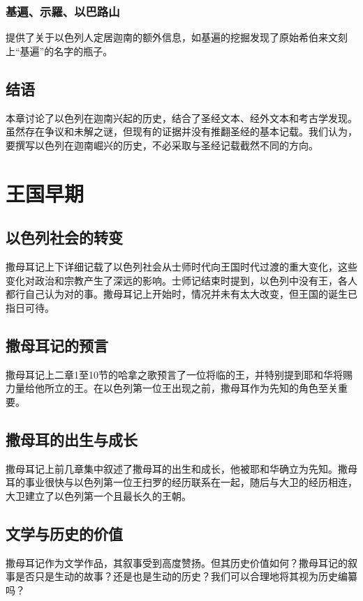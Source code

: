 \documentclass[12pt, a4paper]{ctexart}
\begin{document}
\subsubsection{基遍、示羅、以巴路山}
提供了关于以色列人定居迦南的额外信息，如基遍的挖掘发现了原始希伯来文刻上“基遍”的名字的瓶子。

\subsection{结语}
本章讨论了以色列在迦南兴起的历史，结合了圣经文本、经外文本和考古学发现。虽然存在争议和未解之谜，但现有的证据并没有推翻圣经的基本记载。我们认为，要撰写以色列在迦南崛兴的历史，不必采取与圣经记载截然不同的方向。


\section{王国早期}

\subsection{以色列社会的转变}
撒母耳记上下详细记载了以色列社会从士师时代向王国时代过渡的重大变化，这些变化对政治和宗教产生了深远的影响。士师记结束时提到，以色列中没有王，各人都行自己认为对的事。撒母耳记上开始时，情况并未有太大改变，但王国的诞生已指日可待。

\subsection{撒母耳记的预言}
撒母耳记上二章1至10节的哈拿之歌预言了一位将临的王，并特别提到耶和华将赐力量给他所立的王。在以色列第一位王出现之前，撒母耳作为先知的角色至关重要。

\subsection{撒母耳的出生与成长}
撒母耳记上前几章集中叙述了撒母耳的出生和成长，他被耶和华确立为先知。撒母耳的事业很快与以色列第一位王扫罗的经历联系在一起，随后与大卫的经历相连，大卫建立了以色列第一个且最长久的王朝。

\subsection{文学与历史的价值}
撒母耳记作为文学作品，其叙事受到高度赞扬。但其历史价值如何？撒母耳记的叙事是否只是生动的故事？还是也是生动的历史？我们可以合理地将其视为历史编纂吗？
\end{document}
